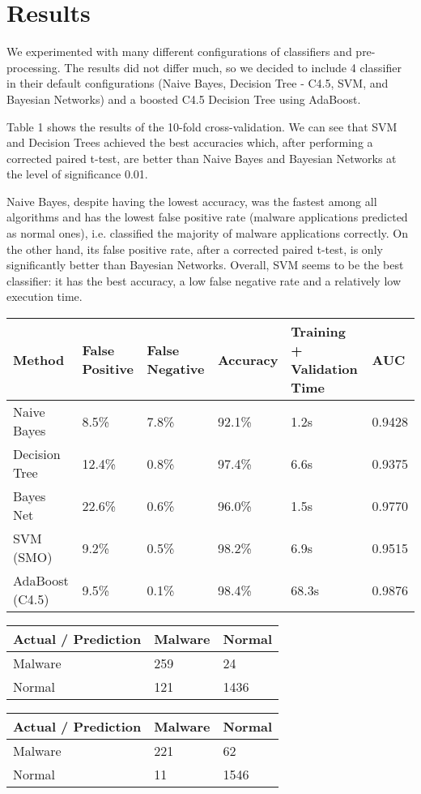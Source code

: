 \section{Results}
We experimented with many different configurations of classifiers and pre-processing. The results did not differ much, so we decided to include 4 classifier in their default configurations (Naive Bayes, Decision Tree - C4.5, SVM, and Bayesian Networks) and a boosted C4.5 Decision Tree using AdaBoost.

Table 1 shows the results of the 10-fold cross-validation. We can see that SVM and Decision Trees achieved the best accuracies which, after performing a corrected paired t-test, are better than Naive Bayes and Bayesian Networks at the level of significance 0.01.

Naive Bayes, despite having the lowest accuracy, was the fastest among all algorithms and has the lowest false positive rate (malware applications predicted as normal ones), i.e. classified the majority of malware applications correctly. On the other hand, its false positive rate, after a corrected paired t-test, is only significantly better than Bayesian Networks. Overall, SVM seems to be the best classifier: it has the best accuracy, a low false negative rate and a relatively low execution time.
\begin{tabular}{|l|l l l l l|}
\hline
Method & False Positive & False Negative & Accuracy & Training + Validation Time & AUC \\
\hline
Naive Bayes & 8.5\% & 7.8\% & 92.1\% & 1.2s & 0.9428 \\
Decision Tree & 12.4\% & 0.8\% & 97.4\% & 6.6s & 0.9375 \\
Bayes Net & 22.6\% & 0.6\% & 96.0\% & 1.5s & 0.9770 \\
SVM (SMO) & 9.2\% & 0.5\% & 98.2\% & 6.9s & 0.9515 \\
AdaBoost (C4.5) & 9.5\% & 0.1\% & 98.4\% & 68.3s & 0.9876 \\
\hline
\end{tabular}
\begin{tabular}{|l|l l|}
\hline
Actual / Prediction & Malware & Normal \\
\hline
Malware & 259 & 24 \\
Normal & 121 & 1436 \\
\hline
\end{tabular}
\begin{tabular}{|l|l l|}
\hline
Actual / Prediction & Malware & Normal \\
\hline
Malware & 221 & 62 \\
Normal & 11 & 1546 \\
\hline
\end{tabular}
